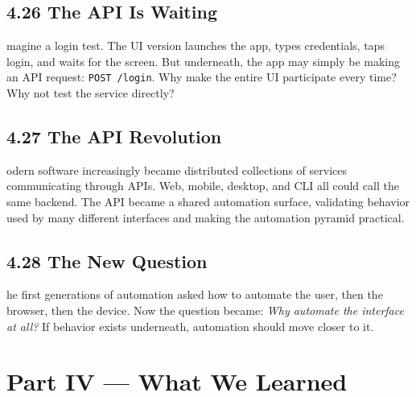 \documentclass[11pt, a4paper, openany]{book}
\newcommand{\initialcap}[1]{{\fontfamily{lmss}\selectfont\huge\textbf{#1}}}
\begin{document}
\section{4.26 The API Is Waiting}
\noindent \initialcap{I}magine a login test. The UI version launches the app, types credentials, taps login, and waits for the screen. But underneath, the app may simply be making an API request: \texttt{POST /login}. Why make the entire UI participate every time? Why not test the service directly?

\section{4.27 The API Revolution}
\noindent \initialcap{M}odern software increasingly became distributed collections of services communicating through APIs. Web, mobile, desktop, and CLI all could call the same backend. The API became a shared automation surface, validating behavior used by many different interfaces and making the automation pyramid practical.

\section{4.28 The New Question}
\noindent \initialcap{T}he first generations of automation asked how to automate the user, then the browser, then the device. Now the question became: \textit{Why automate the interface at all?} If behavior exists underneath, automation should move closer to it.

\chapter*{Part IV --- What We Learned}
\end{document}
